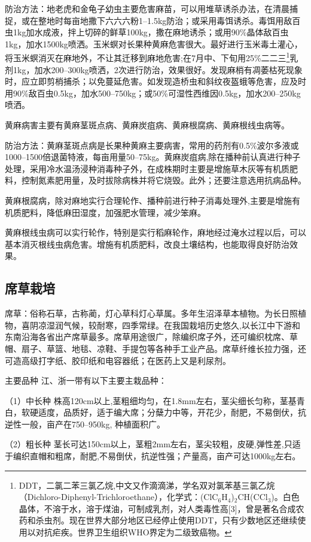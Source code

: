 \documentclass{ctexbook}
\begin{document}
防治方法：地老虎和金龟子幼虫主要危害麻苗，可以用堆草诱杀办法，在清晨捕捉，或在整地时每亩地撒下六六六粉1--1.5kg防治；或采用毒饵诱杀。毒饵用敌百虫1kg加水成液，拌上切碎的鲜草100kg，撒在麻地诱杀；或用90\%晶体敌百虫1kg，加水1500kg喷洒。玉米螟对长果种黄麻危害很大。最好进行玉米毒土灌心，将玉米螟消灭在麻地外，不让其迁移到麻地危害;在7月中、下旬用25\%二二三\footnote{DDT，二氯二苯三氯乙烷,中文又作滴滴涕，学名双对氯苯基三氯乙烷（Dichloro-Diphenyl-Trichloroethane），化学式：(ClC$_6$H$_4$)$_2$CH(CCl$_3$)。白色晶体，不溶于水，溶于煤油，可制成乳剂，对人类毒性高[3]，曾是著名合成农药和杀虫剂。现在世界大部分地区已经停止使用DDT，只有少数地区还继续使用以对抗疟疾。世界卫生组织WHO界定为二级致癌物。}乳剂1kg，加水200--300kg喷洒，2次进行防治，效果很好。发现麻梢有凋萎枯死现象时，应立即剪梢捕杀；以免蔓延危害。如发现造桥虫和斜纹夜盔蛾等危害，应及时用90\%敌百虫0.5kg，加水500--750kg；或50\%可湿性西维因0.5kg，加水200--250kg喷洒。

黄麻病害主要有黄麻茎斑点病、黄麻炭疽病、黄麻根腐病、黄麻根线虫病等。

防治方法：黄麻茎斑点病是长果种黄麻主要病害，常用的药剂有0.5\%波尔多液或1000--1500倍退菌特液，每亩用量50--75kg。黄麻炭疽病,除在播种前认真进行种子处理，采用冷水温汤浸种消毒种子外，在成株期时主要是增施草木灰等有机质肥料，控制氮素肥用量，及时拔除病株并将它烧毁。此外；还要注意选用抗病品种。

黄麻根腐病，除对麻地实行合理轮作、播种前进行种子消毒处理外,主要是增施有机质肥料，降低麻田湿度，加强肥水管理，减少笨麻。

黄麻根线虫病可以实行轮作，特别是实行稻麻轮作，麻地经过淹水过程以后，可以基本消灭根线虫病危害。增施有机质肥料，改良土壤结构，也能取得良好防治效果。
\subsection{席草栽培}
席草：俗称石草，古称蔺，灯心草科灯心草属。多年生沼泽草本植物。为长日照植物，喜阴凉湿润气候，较耐寒，四季常绿。在我国栽培历史悠久,以长江中下游和东南沿海各省出产席草最多。席草用途很广，除编织席子外，还可编织枕席、草帽、扇子、草篮、地毯、凉鞋、手提包等各种手工业产品。席草纤维长拉力强，还可造高级打字纸、胶印纸和电容器纸；在医药上又是利尿剂。

主要品种 江、浙一带有以下主要主栽品种：

（1）中长种 株高120cm以上,茎粗细均匀，在1.8mm左右，茎尖细长匀称，茎基青白，软硬适度，品质好，适于编大席；分蘖力中等，开花少，耐肥，不易倒伏，抗逆性一般，亩产在750--950kg,
种植面积广。

（2）粗长种 茎长可达150cm以上，茎粗2mm左右，茎尖较粗，皮硬,弹性差,只适于编织直帽和粗席，耐肥,不易倒伏，抗逆性强；产量高，亩产可达1000kg左右。
\end{document}
